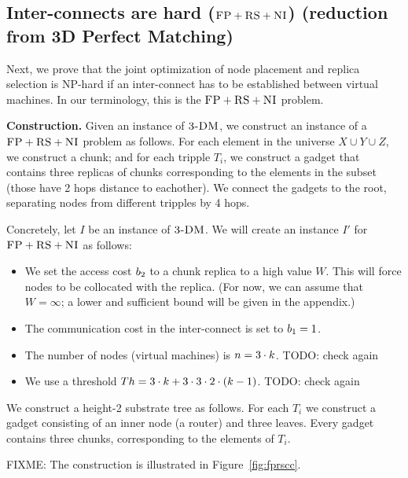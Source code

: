 \subsection{Inter-connects are hard ($\textsc{FP}+\textsc{RS}+\textsc{NI}$) (reduction from 3D Perfect Matching)}\label{ssec:fprscc}


Next, we prove that the joint optimization of node placement and replica selection
is NP-hard if an inter-connect has to be established between virtual machines.
In our terminology, this is the $\textsc{FP}+\textsc{RS}+\textsc{NI}$ problem.


\textbf{Construction.}
Given an instance of $\textsc{3-DM}$, we construct an instance of a
$\textsc{FP}+\textsc{RS}+\textsc{NI}$ problem as follows. For each element
in the universe $X \cup Y \cup Z$, we construct a chunk; and for each
tripple $T_i$, we construct a gadget that contains
three replicas of chunks corresponding to the elements in the subset (those have 2 hops distance to eachother).
We connect the gadgets to the root, separating nodes from different tripples by 4 hops.

Concretely, let $I$ be an instance of $\textsc{3-DM}$. We will create an instance $I'$
for $\textsc{FP}+\textsc{RS}+\textsc{NI}$ as follows:
\begin{itemize}
\item We set the access cost $b_2$ to a chunk replica to a high value $W$. This will force
nodes to be collocated with the replica.
(For now, we can assume that $W=\infty$; a lower and sufficient bound will be given
in the appendix.)
\item The communication cost in the inter-connect is set to $b_1 = 1$.
\item The number of nodes (virtual machines) is $n = 3 \cdot k$. TODO: check again
\item We use a threshold $Th =  3 \cdot k + 3 \cdot 3 \cdot 2 \cdot (k - 1)$. TODO: check again
\end{itemize}

We construct a height-2 substrate tree
as follows. For each $T_i$ we construct a gadget
consisting of an inner node (a router) and three leaves. Every gadget
contains three chunks, corresponding to the elements of $T_i$.

FIXME: The construction is illustrated in Figure~\ref{fig:fprscc}.

